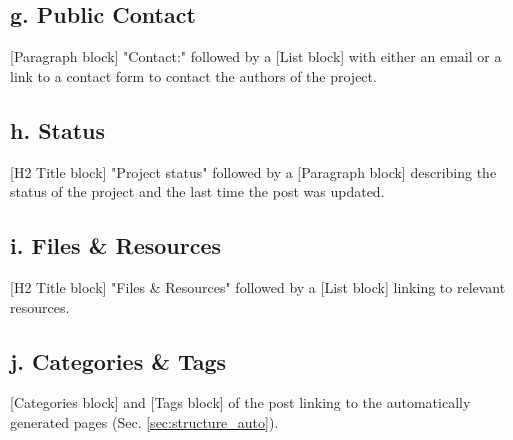 \subsection*{g. Public Contact}
[Paragraph block] "Contact:" followed by a [List block] with either an email or a link to a contact form to contact the authors of the project.

\subsection*{h. Status}
[H2 Title block] "Project status" followed by a [Paragraph block] describing the status of the project and the last time the post was updated.

\subsection*{i. Files \& Resources}
[H2 Title block] "Files \& Resources" followed by a [List block] linking to relevant resources.

\subsection*{j. Categories \& Tags}
[Categories block] and [Tags block] of the post linking to the automatically generated pages (Sec. \ref{sec:structure_auto}).

